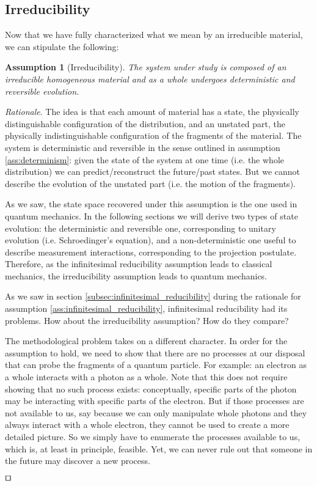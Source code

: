 \documentclass[smallextended]{svjour3}
\numberwithin{equation}{section}
\newenvironment{rationale}{\emph{Rationale}.}{\hfill\(\qed\)}
\newtheorem{assump}{Assumption}
\theoremstyle{definition}
\newenvironment{rationale}{\emph{Rationale}.}{\qed}
\begin{document}
\subsection{Irreducibility}

Now that we have fully characterized what we mean by an irreducible material, we can stipulate the following:

\begin{assump}[Irreducibility]\label{ass:irreducibility}
	The system under study is composed of an irreducible homogeneous material and as a whole undergoes deterministic and reversible evolution.
\end{assump}

\begin{rationale}
	The idea is that each amount of material has a state, the physically distinguishable configuration of the distribution, and an unstated part, the physically indistinguishable configuration of the fragments of the material. The system is deterministic and reversible in the sense outlined in assumption \ref{ass:determinism}: given the state of the system at one time (i.e. the whole distribution) we can predict/reconstruct the future/past states. But we cannot describe the evolution of the unstated part (i.e. the motion of the fragments).
	
	As we saw, the state space recovered under this assumption is the one used in quantum mechanics. In the following sections we will derive two types of state evolution: the deterministic and reversible one, corresponding to unitary evolution (i.e.  Schroedinger's equation), and a non-deterministic one useful to describe measurement interactions, corresponding to the projection postulate. Therefore, as the infinitesimal reducibility assumption leads to classical mechanics, the irreducibility assumption leads to quantum mechanics.
	
	As we saw in section \ref{subsec:infinitesimal_reducibility} during the rationale for assumption \ref{ass:infinitesimal_reducibility}, infinitesimal reducibility had its problems. How about the irreducibility assumption? How do they compare?
	
	The methodological problem takes on a different character. In order for the assumption to hold, we need to show that there are no processes at our disposal that can probe the fragments of a quantum particle. For example: an electron as a whole interacts with a photon as a whole. Note that this does not require showing that no such process exists: conceptually, specific parts of the photon may be interacting with specific parts of the electron. But if those processes are not available to us, say because we can only manipulate whole photons and they always interact with a whole electron, they cannot be used to create a more detailed picture. So we simply have to enumerate the processes available to us, which is, at least in principle, feasible. Yet, we can never rule out that someone in the future may discover a new process.


\end{rationale}
\end{document}
